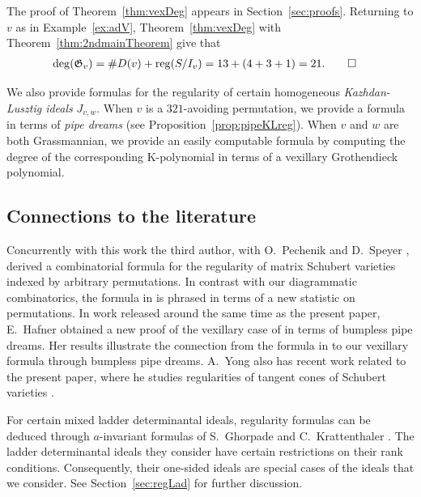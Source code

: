 \documentclass[12pt]{amsart}
\theoremstyle{definition}
\newenvironment{example}
  {\pushQED{\qed}\renewcommand{\qedsymbol}{$\diamondsuit$}\examplex}
  {\popQED\endexamplex}
\theoremstyle{remark}
\numberwithin{equation}{section}
\newcommand{\reg}{{\rm reg}}
\begin{document}
The proof of Theorem~\ref{thm:vexDeg} appears in Section~\ref{sec:proofs}.
\begin{example}
Returning to $v$ as in Example~\ref{ex:adV},
Theorem~\ref{thm:vexDeg} with Theorem~\ref{thm:2ndmainTheorem} give that 
\begin{align*}
\deg(\mathfrak G_v)&= \#D(v) + \reg( S/I_v)= 13 + (4+3+1)=21.\qedhere\end{align*}
\end{example}

We also provide formulas for the regularity of certain homogeneous \emph{Kazhdan-Lusztig ideals} $J_{v,w}$.
When $v$ is a $321$-avoiding permutation, we provide a formula in terms of \emph{pipe dreams} (see Proposition~\ref{prop:pipeKLreg}).  
When $v$ and $w$ are both Grassmannian, we provide an easily computable formula by computing the degree of the corresponding K-polynomial in terms of a vexillary Grothendieck polynomial. 


\subsection{Connections to the literature}
Concurrently with this work the third author, with O.~Pechenik and D.~Speyer \cite{PSW}, derived a combinatorial formula for the regularity of matrix Schubert varieties indexed by arbitrary permutations.  In contrast with our diagrammatic combinatorics, the formula in \cite{PSW} is phrased in terms of a new statistic on permutations. 
In work released around the same time as the present paper,  E.~Hafner \cite{Hafner} obtained a new proof of the vexillary case of \cite{PSW} in terms of bumpless pipe dreams. Her results illustrate the connection from the formula in \cite{PSW} to our vexillary formula through bumpless pipe dreams. A.~Yong also has recent work related to the present paper, where he studies regularities of tangent cones of Schubert varieties \cite{YongReg}.

For certain mixed ladder determinantal ideals, regularity formulas can be deduced through $a$-invariant formulas of S.~Ghorpade and C.~Krattenthaler \cite{GK15}. The ladder determinantal ideals they consider have certain restrictions on their rank conditions. Consequently, their one-sided ideals are special cases of the ideals that we consider. See Section~\ref{sec:regLad} for further discussion.
\end{document}
